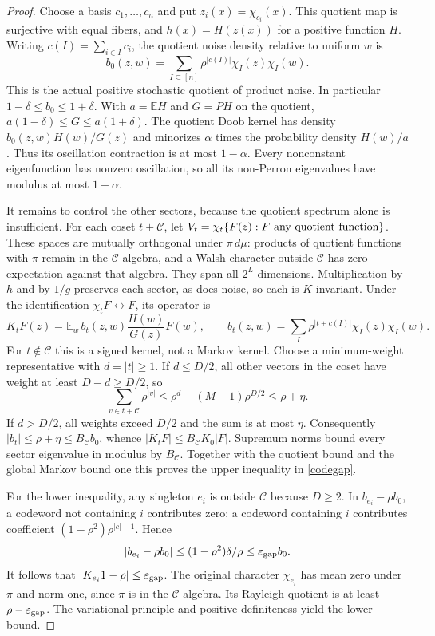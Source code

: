 \documentclass[11pt]{article}
\newcommand{\E}{\mathbb E}
\begin{document}
\begin{proof}
Choose a basis $c_1,\ldots,c_n$ and put $z_i(x)=\chi_{c_i}(x)$. This quotient map is surjective with equal fibers, and $h(x)=H(z(x))$ for a positive function $H$. Writing $c(I)=\sum_{i\in I}c_i$, the quotient noise density relative to uniform $w$ is
\[
 b_0(z,w)=\sum_{I\subseteq[n]}\rho^{|c(I)|}\chi_I(z)\chi_I(w).
\]
This is the actual positive stochastic quotient of product noise. In particular
$1-\delta\leq b_0\leq1+\delta$. With $a=\E H$ and $G=P H$ on the quotient,
$a(1-\delta)\leq G\leq a(1+\delta)$. The quotient Doob kernel has density $b_0(z,w)H(w)/G(z)$ and minorizes $\alpha$ times the probability density $H(w)/a$. Thus its oscillation contraction is at most $1-\alpha$. Every nonconstant eigenfunction has nonzero oscillation, so all its non-Perron eigenvalues have modulus at most $1-\alpha$.

It remains to control the other sectors, because the quotient spectrum alone is insufficient. For each coset $t+\mathcal C$, let
$V_t=\chi_t\{F(z):F\hbox{ any quotient function}\}$. These spaces are mutually orthogonal under $\pi\,d\mu$: products of quotient functions with $\pi$ remain in the $\mathcal C$ algebra, and a Walsh character outside $\mathcal C$ has zero expectation against that algebra. They span all $2^L$ dimensions. Multiplication by $h$ and by $1/g$ preserves each sector, as does noise, so each is $K$-invariant.
Under the identification $\chi_t F\leftrightarrow F$, its operator is
\[
 K_tF(z)=\E_w\, b_t(z,w)\frac{H(w)}{G(z)}F(w),\qquad
 b_t(z,w)=\sum_I\rho^{|t+c(I)|}\chi_I(z)\chi_I(w).
\]
For $t\notin\mathcal C$ this is a signed kernel, not a Markov kernel. Choose a minimum-weight representative with $d=|t|\geq1$. If $d\leq D/2$, all other vectors in the coset have weight at least $D-d\geq D/2$, so
\[
 \sum_{v\in t+\mathcal C}\rho^{|v|}
 \leq\rho^d+(M-1)\rho^{D/2}\leq\rho+\eta.
\]
If $d>D/2$, all weights exceed $D/2$ and the sum is at most $\eta$. Consequently
$|b_t|\leq\rho+\eta\leq B_{\mathcal C}b_0$, whence
$|K_tF|\leq B_{\mathcal C}K_0|F|$. Supremum norms bound every sector eigenvalue in modulus by $B_{\mathcal C}$. Together with the quotient bound and the global Markov bound one this proves the upper inequality in \eqref{codegap}.

For the lower inequality, any singleton $e_i$ is outside $\mathcal C$ because $D\geq2$. In $b_{e_i}-\rho b_0$, a codeword not containing $i$ contributes zero; a codeword containing $i$ contributes coefficient
$(1-\rho^2)\rho^{|c|-1}$. Hence
\[
 |b_{e_i}-\rho b_0|\leq(1-\rho^2)\delta/\rho
 \leq\varepsilon_{\rm gap}b_0.
\]
It follows that $|K_{e_i}1-\rho|\leq\varepsilon_{\rm gap}$. The original character $\chi_{e_i}$ has mean zero under $\pi$ and norm one, since $\pi$ is in the $\mathcal C$ algebra. Its Rayleigh quotient is at least $\rho-\varepsilon_{\rm gap}$. The variational principle and positive definiteness yield the lower bound.


\end{proof}
\end{document}
